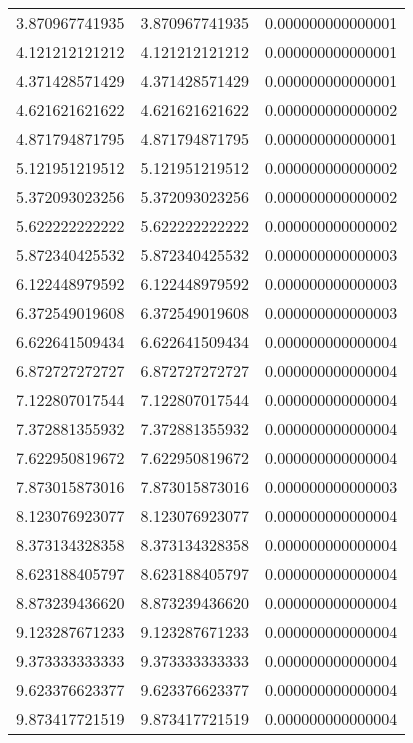 \documentclass[12pt]{scrartcl}
\begin{document}
\begin{table}[H]
\begin{tabular}{ccc}
        \num{3.870967741935} &  \num{3.870967741935} & \num{0.000000000000001} \\
        \num{4.121212121212} &  \num{4.121212121212} & \num{0.000000000000001} \\
        \num{4.371428571429} &  \num{4.371428571429} & \num{0.000000000000001} \\
        \num{4.621621621622} &  \num{4.621621621622} & \num{0.000000000000002} \\
        \num{4.871794871795} &  \num{4.871794871795} & \num{0.000000000000001} \\
        \num{5.121951219512} &  \num{5.121951219512} & \num{0.000000000000002} \\
        \num{5.372093023256} &  \num{5.372093023256} & \num{0.000000000000002} \\
        \num{5.622222222222} &  \num{5.622222222222} & \num{0.000000000000002} \\
        \num{5.872340425532} &  \num{5.872340425532} & \num{0.000000000000003} \\
        \num{6.122448979592} &  \num{6.122448979592} & \num{0.000000000000003} \\
        \num{6.372549019608} &  \num{6.372549019608} & \num{0.000000000000003} \\
        \num{6.622641509434} &  \num{6.622641509434} & \num{0.000000000000004} \\
        \num{6.872727272727} &  \num{6.872727272727} & \num{0.000000000000004} \\
        \num{7.122807017544} &  \num{7.122807017544} & \num{0.000000000000004} \\
        \num{7.372881355932} &  \num{7.372881355932} & \num{0.000000000000004} \\
        \num{7.622950819672} &  \num{7.622950819672} & \num{0.000000000000004} \\
        \num{7.873015873016} &  \num{7.873015873016} & \num{0.000000000000003} \\
        \num{8.123076923077} &  \num{8.123076923077} & \num{0.000000000000004} \\
        \num{8.373134328358} &  \num{8.373134328358} & \num{0.000000000000004} \\
        \num{8.623188405797} &  \num{8.623188405797} & \num{0.000000000000004} \\
        \num{8.873239436620} &  \num{8.873239436620} & \num{0.000000000000004} \\
        \num{9.123287671233} &  \num{9.123287671233} & \num{0.000000000000004} \\
        \num{9.373333333333} &  \num{9.373333333333} & \num{0.000000000000004} \\
        \num{9.623376623377} &  \num{9.623376623377} & \num{0.000000000000004} \\
        \num{9.873417721519} &  \num{9.873417721519} & \num{0.000000000000004} \\
    \end{tabular}
\end{table}
\end{document}
